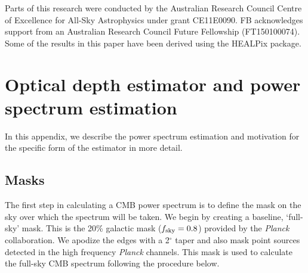 \documentclass[]{pasa}
\def\etal{{\rm et~al.~}}
\begin{document}






\begin{acknowledgements}
Parts of this research were conducted by the Australian Research Council Centre of Excellence
for All-Sky Astrophysics under grant CE11E0090. FB acknowledges support from an Australian Research Council Future Fellowship (FT150100074). Some of the results in this paper have been derived using the HEALPix \citep{healpix} package.
\end{acknowledgements}


\appendix
\section{Optical depth estimator and power spectrum estimation}
In this appendix, we describe the power spectrum estimation and motivation for the specific form of the estimator in more detail. 

\subsection{Masks}

The first step in calculating a CMB power spectrum is to define the mask on the sky over which the spectrum will be taken. 
We begin by creating a baseline, `full-sky' mask. 
This is the 20\% galactic mask  ($f_{\rm sky}=0.8$) provided by the \textit{Planck} collaboration. 
We apodize the edges with a 2$^\circ$ taper and also mask point sources detected in the high frequency \textit{Planck} channels. 
This mask is used to calculate the full-sky CMB spectrum following the procedure below. 
\end{document}
